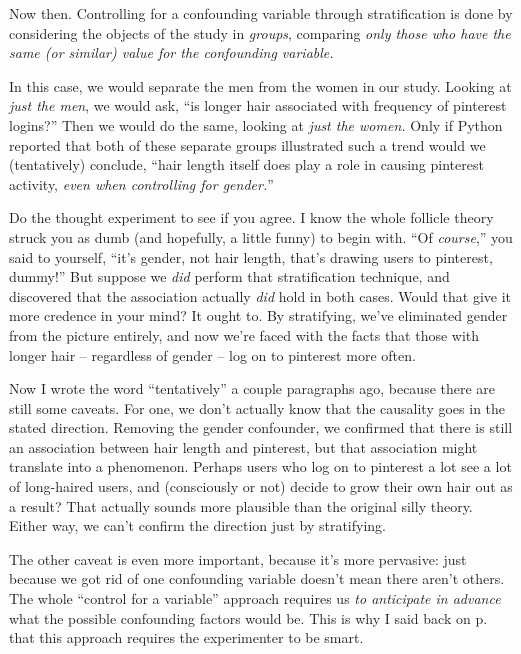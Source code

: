 
Now then. Controlling for a confounding variable through stratification is done
by considering the objects of the study in \textit{groups}, comparing
\textit{only those who have the same (or similar) value for the confounding
variable.}

In this case, we would separate the men from the women in our study. Looking at
\textit{just the men}, we would ask, ``is longer hair associated with frequency
of pinterest logins?'' Then we would do the same, looking at \textit{just the
women.} Only if Python reported that both of these separate groups illustrated
such a trend would we (tentatively) conclude, ``hair length itself does play a
role in causing pinterest activity, \textit{even when controlling for
gender.}''

Do the thought experiment to see if you agree. I know the whole follicle theory
struck you as dumb (and hopefully, a little funny) to begin with. ``Of
\textit{course},'' you said to yourself, ``it's gender, not hair length, that's
drawing users to pinterest, dummy!'' But suppose we \textit{did} perform that
stratification technique, and discovered that the association actually
\textit{did} hold in both cases. Would that give it more credence in your mind?
It ought to. By stratifying, we've eliminated gender from the picture entirely,
and now we're faced with the facts that those with longer hair -- regardless of
gender -- log on to pinterest more often. 


Now I wrote the word ``tentatively'' a couple paragraphs ago, because there are
still some caveats. For one, we don't actually know that the causality goes in
the stated direction. Removing the gender confounder, we confirmed that there
is still an association between hair length and pinterest, but that association
might translate into a  phenomenon. Perhaps users who log on
to pinterest a lot see a lot of long-haired users, and (consciously or not)
decide to grow their own hair out as a result? That actually sounds more
plausible than the original silly theory. Either way, we can't confirm the
direction just by stratifying.

The other caveat is even more important, because it's more pervasive: just
because we got rid of one confounding variable doesn't mean there aren't
others. The whole ``control for a variable'' approach requires us \textit{to
anticipate in advance} what the possible confounding factors would be. This is
why I said back on p.~\pageref{smart} that this approach requires the
experimenter to be smart.

